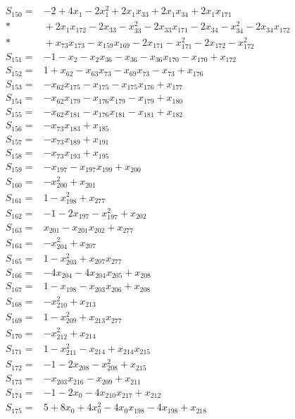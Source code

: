 \begin{align*}
S_{150}={}&-2+4x_{1}-2x_{1}^{2}+2x_{1}x_{33}+2x_{1}x_{34}+2x_{1}x_{171}\\*
&{}+2x_{1}x_{172}-2x_{33}-x_{33}^{2}-2x_{33}x_{171}-2x_{34}-x_{34}^{2}-2x_{34}x_{172}\\*
&{}+x_{73}x_{173}-x_{159}x_{169}-2x_{171}-x_{171}^{2}-2x_{172}-x_{172}^{2}\\[3pt]
S_{151}={}&-1-x_{2}-x_{2}x_{36}-x_{36}-x_{36}x_{170}-x_{170}+x_{172}\\[3pt]
S_{152}={}&1+x_{62}-x_{63}x_{73}-x_{69}x_{73}-x_{73}+x_{176}\\[3pt]
S_{153}={}&-x_{62}x_{175}-x_{175}-x_{175}x_{176}+x_{177}\\[3pt]
S_{154}={}&-x_{62}x_{179}-x_{176}x_{179}-x_{179}+x_{180}\\[3pt]
S_{155}={}&-x_{62}x_{181}-x_{176}x_{181}-x_{181}+x_{182}\\[3pt]
S_{156}={}&-x_{73}x_{183}+x_{185}\\[3pt]
S_{157}={}&-x_{73}x_{189}+x_{191}\\[3pt]
S_{158}={}&-x_{73}x_{193}+x_{195}\\[3pt]
S_{159}={}&-x_{197}-x_{197}x_{199}+x_{200}\\[3pt]
S_{160}={}&-x_{200}^{2}+x_{201}\\[3pt]
S_{161}={}&1-x_{198}^{2}+x_{277}\\[3pt]
S_{162}={}&-1-2x_{197}-x_{197}^{2}+x_{202}\\[3pt]
S_{163}={}&x_{201}-x_{201}x_{202}+x_{277}\\[3pt]
S_{164}={}&-x_{204}^{2}+x_{207}\\[3pt]
S_{165}={}&1-x_{203}^{2}+x_{207}x_{277}\\[3pt]
S_{166}={}&-4x_{204}-4x_{204}x_{205}+x_{208}\\[3pt]
S_{167}={}&1-x_{198}-x_{203}x_{206}+x_{208}\\[3pt]
S_{168}={}&-x_{210}^{2}+x_{213}\\[3pt]
S_{169}={}&1-x_{209}^{2}+x_{213}x_{277}\\[3pt]
S_{170}={}&-x_{212}^{2}+x_{214}\\[3pt]
S_{171}={}&1-x_{211}^{2}-x_{214}+x_{214}x_{215}\\[3pt]
S_{172}={}&-1-2x_{208}-x_{208}^{2}+x_{215}\\[3pt]
S_{173}={}&-x_{203}x_{216}-x_{209}+x_{211}\\[3pt]
S_{174}={}&-1-2x_{0}-4x_{210}x_{217}+x_{212}\\[3pt]
S_{175}={}&5+8x_{0}+4x_{0}^{2}-4x_{0}x_{198}-4x_{198}+x_{218}\\[3pt]

\end{align*}
